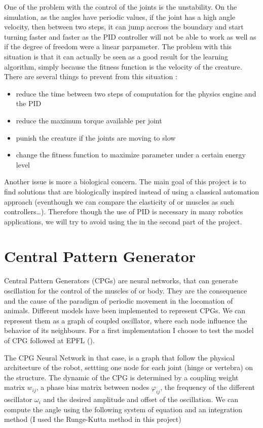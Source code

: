 One of the problem with the control of the joints is the unstability. On the simulation, as the angles have periodic values, if the joint has a high angle velocity, then between two steps, it can jump accross the boundary and start turning faster and faster as the PID controller will not be able to work as well as if the degree of freedom were a linear parpameter. The problem with this situation is that it can actually be seen as a good result for the learning algorithm, simply because the fitness function is the velocity of the creature. There are several things to prevent from this situation :

\begin{itemize}
    \item reduce the time between two steps of computation for the physics engine and the PID
    \item reduce the maximum torque available per joint
    \item punish the creature if the joints are moving to slow
    \item change the fitness function to maximize parameter under a certain energy level
\end{itemize}
        

Another issue is more a biological concern. The main goal of this project is to find solutions that are biologically inspired instead of using a classical automation approach (eventhough we can compare the elasticity of or muscles as such controllers\ldots). Therefore though the use of PID is necessary in many robotics applications, we will try to avoid using the in the second part of the project. 

\section{Central Pattern Generator}

Central Pattern Generators (CPGs) are neural networks, that can generate oscillation for the control of the muscles of or body. They are the consequence and the cause of the paradigm of periodic movement in the locomation of animals. Different models have been implemented to represent CPGs. We can represent them as a graph of coupled oscillator, where each node influence the behavior of its neighbours. For a first implementation I choose to test the model of CPG followed at EPFL (\cite{sproewitz}). 

The CPG Neural Network in that case, is a graph that follow the physical architecture of the robot, settting one node for each joint (hinge or vertebra) on the structure. The dynamic of the CPG is determined by a coupling weight matrix $w_{ij}$, a phase bias matrix between nodes $\varphi_{ij}$, the frequency of the different oscillator $\omega_i$ and the desired amplitude and offset of the oscillation. We can compute the angle using the following system of equation and an integration method (I used the Runge-Kutta method in this project)

